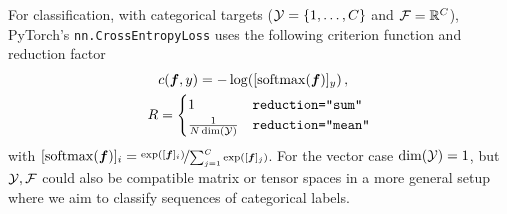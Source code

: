 \begin{example}\label{ex:cross_entropy_loss}
  For classification, with categorical targets (${\mathcal{Y}} = \{1, \dots, C\}$ and ${\mathcal{F}} = {\mathbb{R}}^C$), PyTorch's \texttt{nn.CrossEntropyLoss} uses the following criterion function and reduction factor
  \begin{align*}
    &c({\bm{f}}, y)
      =
      - \log([\mathrm{softmax}({\bm{f}})]_y)\,,
    \\
    R
    &=
      \begin{cases}
        1                     & \text{\texttt{reduction="sum"}}
        \\
        \frac{1}{N \dim({\mathcal{Y}})} & \text{\texttt{reduction="mean"}}
      \end{cases}
  \end{align*}
  with $[\mathrm{softmax}({\bm{f}})]_i = \nicefrac{\exp([{\bm{f}}]_i)}{\sum_{j=1}^C \exp([{\bm{f}}]_{j})}$.
  For the vector case $\dim({\mathcal{Y}}) = 1$, but ${\mathcal{Y}}, {\mathcal{F}}$ could also be compatible matrix or tensor spaces in a more general setup where we aim to classify sequences of categorical labels.
\end{example}

